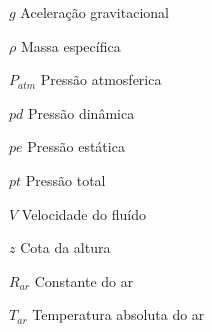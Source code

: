 \begin{simbolos} \itemsep -1pt
	\item[$g$] Aceleração gravitacional
	\item[$\rho$] Massa específica
	\item[$P_{atm}$] Pressão atmosferica
	\item[$ pd $] Pressão dinâmica
	\item[$ pe $] Pressão estática
	\item[$ pt $] Pressão total
	\item[$V$] Velocidade do fluído
	\item[$z$] Cota da altura
	\item[$R_{ar}$] Constante do ar
	\item[$T_{ar}$] Temperatura absoluta do ar
\end{simbolos}